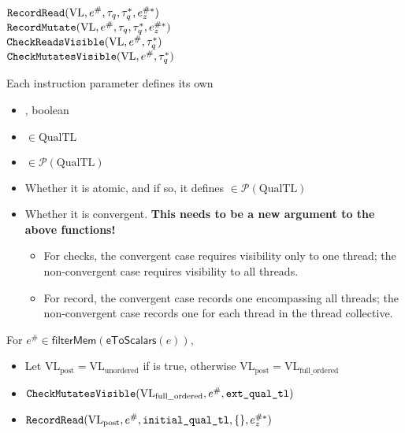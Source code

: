 




${\color{black}\texttt{RecordRead}}(\mathrm{VL}, e^\#, \tau_q, \tau_q^*, e_z^{\#*})$ \\
${\color{black}\texttt{RecordMutate}}(\mathrm{VL}, e^\#, \tau_q, \tau_q^*, e_z^{\#*})$\\
${\color{black}\texttt{CheckReadsVisible}}(\mathrm{VL}, e^\#, \tau_q^*)$\\
${\color{black}\texttt{CheckMutatesVisible}}(\mathrm{VL}, e^\#, \tau_q^*)$

Each instruction parameter defines its own
\begin{itemize}
  \item {}, boolean
  \item {} $\in \mathrm{QualTL}$
  \item {} $\in \mathcal{P}(\mathrm{QualTL})$
  \item Whether it is atomic, and if so, it defines  $\in \mathcal{P}(\mathrm{QualTL})$
  \item Whether it is convergent.
    \textbf{This needs to be a new argument to the above functions!}
    \begin{itemize}
      \item For checks, the convergent case requires visibility only to one thread; the non-convergent case requires visibility to all threads.
      \item For record, the convergent case records one  encompassing all threads; the non-convergent case records one  for each thread in the thread collective.
    \end{itemize}
\end{itemize}


For $e^\# \in \mathsf{filterMem}(\mathsf{eToScalars}(e))$,
\begin{itemize}
  \item Let $\mathrm{VL_{post}} = \mathrm{VL_{unordered}}$ if  is true, otherwise $\mathrm{VL_{post}} = \mathrm{VL_{full\_ordered}}$
  \item ${\color{black}\texttt{CheckMutatesVisible}}(\mathrm{VL_{full\_ordered}}, e^\#, {\color{black}\texttt{ext\_qual\_tl}})$
  \item ${\color{black}\texttt{RecordRead}}(\mathrm{VL_{post}}, e^\#, {\color{black}\texttt{initial\_qual\_tl}}, \{\}, e_z^{\#*})$
\end{itemize}

